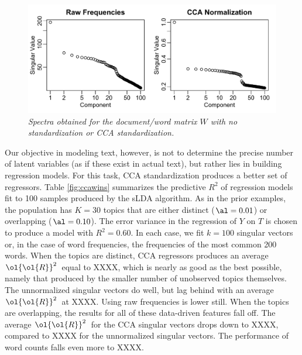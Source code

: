 \documentclass[12pt]{article}
\newcommand{\prs}{\mbox{$\ol{\ol{R}}^2$}}
\begin{document}
\begin{figure}
\caption{ \label{fig:spectra} 
{ \sl Spectra obtained for the document/word matrix $W$ with no standardization or CCA standardization.}}
 \centerline{
 \vspace{0.1in}
 \includegraphics[width=6.0in]{figures/spectra} }
 \end{figure}


Our objective in modeling text, however, is not to determine the precise number of latent variables (as if these exist in actual text), but rather lies in building regression models.  For this task, CCA  standardization produces a better set of regressors.  Table \ref{fig:ccawins} summarizes the predictive $R^2$ of regression models fit to 100 samples produced by the sLDA algorithm.  As in the prior examples, the population has $K=30$ topics that are either distinct ($\al=0.01$) or overlapping ($\al=0.10$).  The error variance in the regression of $Y$ on $T$ is chosen to produce a model with $R^2 = 0.60$.  In each case, we fit $k=100$ singular vectors or, in the case of word frequencies, the frequencies of the most common 200 words.  When the topics are distinct,  CCA regressors produces an average \prs\ equal to XXXX, which is nearly as good as the best possible, namely that produced by the smaller number of unobserved topics themselves.  The unnormalized singular vectors do well, but lag behind with an average \prs\ at XXXX.  Using raw frequencies is lower still.  When the topics are overlapping, the results for all of these data-driven features fall off.  The average \prs\ for the CCA singular vectors drops down to XXXX, compared to XXXX for the unnormalized singular vectors.  The performance of word counts falls even more to XXXX.
\end{document}

